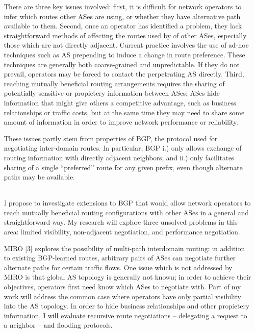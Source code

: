 \documentclass[12pt]{article}	%
\begin{document}
There are three key issues involved: first, it is
difficult for network operators to infer which routes other ASes are
using, or whether they have alternative path available to them. Second, once
an operator has identified a problem, they lack straightforward methods of affecting the routes used
by of other ASes, especially those which are not directly adjacent. Current
practice involves the use of ad-hoc techniques such as AS prepending to
induce a change in route preference. These techniques are generally both coarse-grained
and unpredictable. If they do not prevail, operators may be forced to contact the
perpetrating AS directly. Third, reaching mutually beneficial routing
arrangements requires the sharing of potentially sensitive or propietery information
between ASes; ASes hide information that might give others a
competitive advantage, such as business relationships or traffic costs, but at
the same time they may need to share some amount of information in order to improve
network performance or reliability.

These issues partly stem from properties of BGP, the protocol used for negotiating inter-domain routes.
In particular, BGP i.) only allows exchange of routing
information with directly adjacent neighbors, and ii.) only facilitates sharing
of a single ``preferred'' route for any given prefix, even though alternate paths may
be available.

 \\
\indent I propose to investigate extensions to BGP that would allow network
operators to reach mutually beneficial routing configurations with other
ASes in a general and straightforward way. My research will explore three
unsolved problems in this area: limited visibility, non-adjacent negotiation, and
performance negotiation.

MIRO [3] explores the possibility of multi-path interdomain routing: in
addition to existing BGP-learned routes, arbitrary pairs of ASes can negotiate further
alternate paths for certain traffic flows. One issue which is not addressed by MIRO is
that global AS topology is generally not known; in order to achieve their objectives,
operators first need know which ASes to negotiate with. Part of my work
will address the common case where operators have only partial visibility into the AS
topology. In order to hide business relationships and other propietery
information, I will evaluate recursive route negotiations -- delegating a request
to a neighbor -- and flooding protocols.
\end{document}
